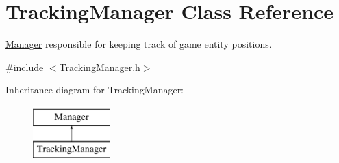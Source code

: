 \hypertarget{classTrackingManager}{\section{Tracking\-Manager Class Reference}
\label{classTrackingManager}
}


\hyperlink{classManager}{Manager} responsible for keeping track of game entity positions.  




{\ttfamily \#include $<$Tracking\-Manager.\-h$>$}

Inheritance diagram for Tracking\-Manager\-:\begin{figure}[H]
\begin{center}
\leavevmode
\includegraphics[height=2.000000cm]{classTrackingManager}
\end{center}
\end{figure}
